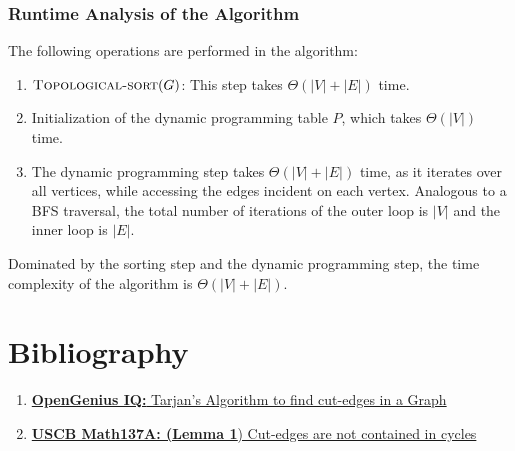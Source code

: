 \documentclass[12pt]{report}
\begin{document}
    \vfill

    \subsubsection*{Runtime Analysis of the Algorithm}
    The following operations are performed in the algorithm:
    \begin{enumerate}
        \item $\Call{Topological-sort}{G}$: This step takes $\Theta(|V|+|E|)$ time.
        \item Initialization of the dynamic programming table $P$, which takes $\Theta(|V|)$ time.
        \item The dynamic programming step takes $\Theta(|V|+|E|)$ time, as it iterates over all vertices,
        while accessing the edges incident on each vertex.
        Analogous to a BFS traversal, the total number of iterations of the outer loop is $|V|$ and the inner loop is $|E|$.
    \end{enumerate}
    Dominated by the sorting step and the dynamic programming step, the time complexity of the algorithm is $\Theta(|V|+|E|)$.
    \vfill
    \pagebreak

    \section*{Bibliography}
    \begin{enumerate}
        \item
        \href{
            https://iq.opengenus.org/find-cut-edges-in-a-graph/#:~:text=A%
            }{\textbf{OpenGenius IQ:} Tarjan's Algorithm to find cut-edges in a Graph}
        \item
        \href{
            http://web.math.ucsb.edu/~padraic/ucsb_2013_14/math137a_w2014/math137a_w2014_lecture3.pdf
        }{\textbf{USCB Math137A: (Lemma 1}) Cut-edges are not contained in cycles}
    \end{enumerate}
\end{document}
